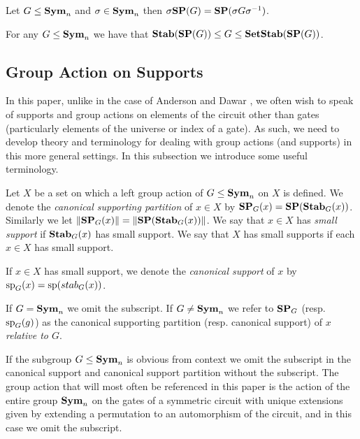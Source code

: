 \documentclass[../paper.tex]{subfiles}
\begin{document}
\begin{lem}
  \label{lem:SP_conjugation}
  Let $G \leq \text{\textbf{Sym}}_n$ and $\sigma \in \text{\textbf{Sym}}_n$ then $\sigma \text{\textbf{SP}} (G) = \text{\textbf{SP}}(\sigma
  G \sigma^{-1})$.
\end{lem}

\begin{lem}
  For any $G \leq \text{\textbf{Sym}}_n$ we have that $\text{\textbf{Stab}} (\text{\textbf{SP}} (G)) \leq G \leq
  \text{\textbf{SetStab}}(\text{\textbf{SP}}(G))$.
\end{lem}

\subsection{Group Action on Supports}
\label{subsec:group-actions-on-supports}
In this paper, unlike in the case of Anderson and Dawar \cite{AndersonD17}, we
often wish to speak of supports and group actions on elements of the circuit
other than gates (particularly elements of the universe or index of a gate). As
such, we need to develop theory and terminology for dealing with group actions
(and supports) in this more general settings. In this subsection we introduce
some useful terminology.

\begin{definition}
  Let $X$ be a set on which a left group action of $G \leq \text{\textbf{Sym}}_n$ on $X$ is
  defined. We denote the \emph{canonical supporting partition} of $x \in X$ by
  $\text{\textbf{SP}}_G (x) = \text{\textbf{SP}} (\text{\textbf{Stab}}_G(x))$. Similarly we let $\| \text{\textbf{SP}}_G (x) \| = \| \text{\textbf{SP}}
  (\text{\textbf{Stab}}_G(x)) \|$. We say that $x \in X$ has \emph{small support} if
  $\text{\textbf{Stab}}_G(x)$ has small support. We say that $X$ has small supports if each $x
  \in X$ has small support.

  If $x \in X$ has small support, we denote the \emph{canonical support} of $x$
  by $\text{sp}_G(x) = \text{sp} (stab_G(x))$.

  If $G = \text{\textbf{Sym}}_n$ we omit the subscript. If $G \neq \text{\textbf{Sym}}_n$ we refer to $\text{\textbf{SP}}_G$
  (resp. $\text{sp}_G(g)$) as the canonical supporting partition (resp. canonical
  support) of $x$ \emph{relative to $G$}.
\end{definition}

If the subgroup $G \leq \text{\textbf{Sym}}_n$ is obvious from context we omit the subscript in
the canonical support and canonical support partition without the subscript. The
group action that will most often be referenced in this paper is the action of
the entire group $\text{\textbf{Sym}}_n$ on the gates of a symmetric circuit with unique
extensions given by extending a permutation to an automorphism of the circuit,
and in this case we omit the subscript.
\end{document}
